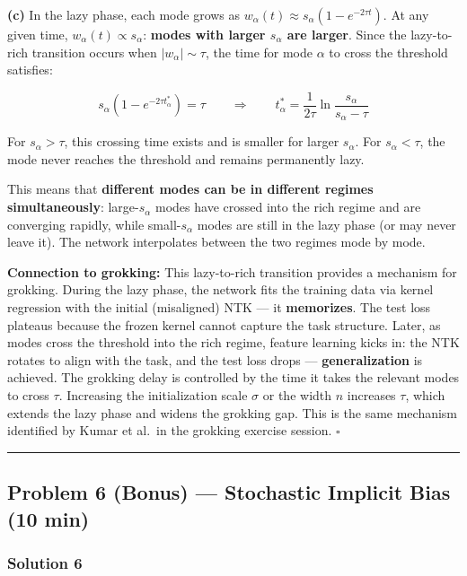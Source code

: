 \documentclass[
]{article}
\begin{document}
\textbf{(c)} In the lazy phase, each mode grows as
\(w_\alpha(t) \approx s_\alpha(1 - e^{-2\tau t})\). At any given time,
\(w_\alpha(t) \propto s_\alpha\): \textbf{modes with larger \(s_\alpha\)
are larger}. Since the lazy-to-rich transition occurs when
\(|w_\alpha| \sim \tau\), the time for mode \(\alpha\) to cross the
threshold satisfies:

\[s_\alpha(1 - e^{-2\tau t_\alpha^*}) = \tau \qquad \Longrightarrow \qquad t_\alpha^* = \frac{1}{2\tau}\ln\frac{s_\alpha}{s_\alpha - \tau}\]

For \(s_\alpha > \tau\), this crossing time exists and is smaller for
larger \(s_\alpha\). For \(s_\alpha < \tau\), the mode never reaches the
threshold and remains permanently lazy.

This means that \textbf{different modes can be in different regimes
simultaneously}: large-\(s_\alpha\) modes have crossed into the rich
regime and are converging rapidly, while small-\(s_\alpha\) modes are
still in the lazy phase (or may never leave it). The network
interpolates between the two regimes mode by mode.

\textbf{Connection to grokking:} This lazy-to-rich transition provides a
mechanism for grokking. During the lazy phase, the network fits the
training data via kernel regression with the initial (misaligned) NTK
--- it \textbf{memorizes}. The test loss plateaus because the frozen
kernel cannot capture the task structure. Later, as modes cross the
threshold into the rich regime, feature learning kicks in: the NTK
rotates to align with the task, and the test loss drops ---
\textbf{generalization} is achieved. The grokking delay is controlled by
the time it takes the relevant modes to cross \(\tau\). Increasing the
initialization scale \(\sigma\) or the width \(n\) increases \(\tau\),
which extends the lazy phase and widens the grokking gap. This is the
same mechanism identified by Kumar et al.~in the grokking exercise
session. \(\square\)

\begin{center}\rule{0.5\linewidth}{0.5pt}\end{center}

\subsection{Problem 6 (Bonus) --- Stochastic Implicit Bias (10
min)}\label{problem-6-bonus-stochastic-implicit-bias-10-min}

\subsubsection{Solution 6}\label{solution-6}
\end{document}
